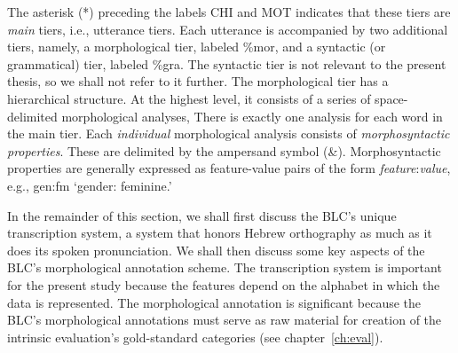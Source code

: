The asterisk (*) preceding the labels CHI and \textsf{MOT} 
indicates that these tiers are \emph{main} tiers, i.e.,  
utterance tiers. Each utterance is accompanied by two 
additional tiers, 
namely, a morphological tier, labeled \textsf{\%mor}, 
and a syntactic (or grammatical) tier, labeled \textsf{\%gra}. 
The syntactic tier is not relevant to the present thesis,
so we shall not refer to it further. The morphological tier 
has a hierarchical structure. At the highest level, it consists of a 
series of space-delimited morphological analyses, 
There is exactly one analysis for each word in the main tier.  
Each \emph{individual} morphological analysis consists
of \textit{morphosyntactic properties}. These are delimited by the 
ampersand symbol (\textsf{\&}). Morphosyntactic properties are 
generally expressed as feature-value pairs of the 
form \textsf{\textit{feature}:\textit{value}}, e.g., 
\textsf{gen:fm} `gender: feminine.' 

In the remainder of this section, we shall first discuss the 
\ac{BLC}'s unique transcription system, a system that 
honors Hebrew orthography as much as it does its spoken 
pronunciation. We shall then discuss some key aspects of 
the \ac{BLC}'s morphological annotation scheme. The 
transcription system is important for the present study 
because the features
depend on the alphabet in which the data is represented.
 The morphological annotation 
is significant because  the BLC's morphological annotations must 
serve as raw material for creation of  the intrinsic evaluation's 
gold-standard categories (see chapter~\ref{ch:eval}).


